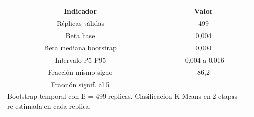 \begin{center}
\scriptsize
\renewcommand{\arraystretch}{1.1}
\begin{tabular}{cc}
\hline
Indicador & Valor \\
\hline\hline
Réplicas válidas & 499 \\
Beta base & 0,004 \\
Beta mediana bootstrap & 0,004 \\
Intervalo P5-P95 & -0,004 a 0,016 \\
Fracción mismo signo & 86,2\\%
Fracción signif. al 5\\%
\hline
\multicolumn{2}{l}{\tiny Bootstrap temporal con B = 499 replicas. Clasificacion K-Means en 2 etapas re-estimada en cada replica.}\\
\end{tabular}
\end{center}
